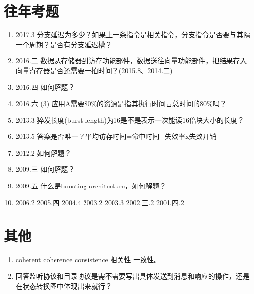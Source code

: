 \documentclass[a4paper]{ctexart}
\begin{document}
\section{往年考题}
\begin{enumerate}
  \item 2017.3 分支延迟为多少？如果上一条指令是相关指令，分支指令是否要与其隔一个周期？是否有分支延迟槽？
  \item 2016.二 数据从存储器到访存功能部件，数据送往向量功能部件，把结果存入向量寄存器是否还需要一拍时间？(2015.8、2014.二)
  \item 2016.四 如何解题？
  \item 2016.六 (3) 应用A需要80\%的资源是指其执行时间占总时间的80\%吗？
  \item 2013.3 猝发长度(burst length)为16是不是表示一次能读16倍块大小的长度？
  \item 2013.5 答案是否唯一？平均访存时间=命中时间+失效率x失效开销
  \item 2012.2 如何解题？
  \item 2009.三 如何解题？
  \item 2009.五 什么是boosting architecture，如何解题？
  \item 2006.2 2005.四 2004.4 2003.2 2003.3 2002.三.2 2001.四.2
\end{enumerate}

\section{其他}
\begin{enumerate}
  \item coherent coherence consistence 相关性 一致性。
  \item 回答监听协议和目录协议是需不需要写出具体发送到消息和响应的操作，还是在状态转换图中体现出来就行？
\end{enumerate}
\end{document}
